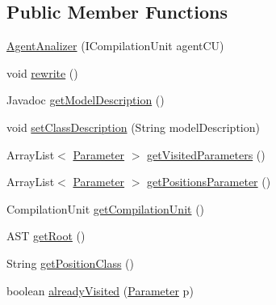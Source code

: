 \subsection*{Public Member Functions}
\begin{DoxyCompactItemize}
\item 
\hyperlink{classit_1_1isislab_1_1masonhelperdocumentation_1_1analizer_1_1_agent_analizer_adc8b62d98bb421e6baa3373f3694fee8}{Agent\-Analizer} (I\-Compilation\-Unit agent\-C\-U)
\item 
void \hyperlink{classit_1_1isislab_1_1masonhelperdocumentation_1_1analizer_1_1_agent_analizer_aa330ee12112641e1ba3d9acedb9401b9}{rewrite} ()
\item 
Javadoc \hyperlink{classit_1_1isislab_1_1masonhelperdocumentation_1_1analizer_1_1_agent_analizer_a4a819d1324aa806e8bc729bb5d6ce398}{get\-Model\-Description} ()
\item 
void \hyperlink{classit_1_1isislab_1_1masonhelperdocumentation_1_1analizer_1_1_agent_analizer_a1dcc3313d7fe6fa67fd3c27433b78763}{set\-Class\-Description} (String model\-Description)
\item 
Array\-List$<$ \hyperlink{classit_1_1isislab_1_1masonhelperdocumentation_1_1analizer_1_1_parameter}{Parameter} $>$ \hyperlink{classit_1_1isislab_1_1masonhelperdocumentation_1_1analizer_1_1_agent_analizer_aed0a62fd5108f41992ade938d6bcd9cc}{get\-Visited\-Parameters} ()
\item 
Array\-List$<$ \hyperlink{classit_1_1isislab_1_1masonhelperdocumentation_1_1analizer_1_1_parameter}{Parameter} $>$ \hyperlink{classit_1_1isislab_1_1masonhelperdocumentation_1_1analizer_1_1_agent_analizer_aa2e85956f4a23176c398294cf02d859d}{get\-Positions\-Parameter} ()
\item 
Compilation\-Unit \hyperlink{classit_1_1isislab_1_1masonhelperdocumentation_1_1analizer_1_1_agent_analizer_af956b9fdd9d6b6b97d4982cba816d441}{get\-Compilation\-Unit} ()
\item 
A\-S\-T \hyperlink{classit_1_1isislab_1_1masonhelperdocumentation_1_1analizer_1_1_agent_analizer_a32883fb3c910d96ba584549d27856ce1}{get\-Root} ()
\item 
String \hyperlink{classit_1_1isislab_1_1masonhelperdocumentation_1_1analizer_1_1_agent_analizer_a5f65d6f8f8c1a00b0b66fb3dd0ab37cb}{get\-Position\-Class} ()
\item 
boolean \hyperlink{classit_1_1isislab_1_1masonhelperdocumentation_1_1analizer_1_1_agent_analizer_a6be22d4f751e44b18796b10767b581d5}{already\-Visited} (\hyperlink{classit_1_1isislab_1_1masonhelperdocumentation_1_1analizer_1_1_parameter}{Parameter} p)

\end{DoxyCompactItemize}
